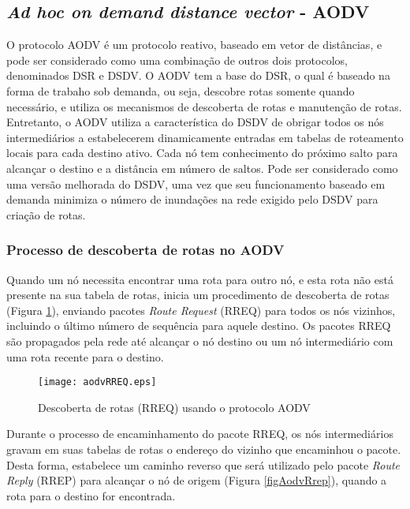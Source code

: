 \subsection{\textit{Ad hoc on demand distance vector} - AODV}
O protocolo AODV \'e um protocolo reativo\cite{gorantala}, baseado em vetor de dist\^ancias, e pode ser considerado como uma combina\c{c}\~ao de outros dois protocolos, denominados DSR e DSDV. 
O AODV tem a base do DSR, o qual \'e baseado na forma de trabaho sob demanda, ou seja, descobre rotas somente quando necess\'ario, e utiliza os mecanismos de descoberta de rotas e manuten\c{c}\~ao de rotas.
Entretanto, o AODV utiliza a caracter\'istica do DSDV de obrigar todos os n\'os intermedi\'arios a estabelecerem dinamicamente entradas em tabelas de roteamento locais para cada destino ativo.
Cada n\'o tem conhecimento do pr\'oximo salto para alcan\c{c}ar o destino e a dist\^ancia em n\'umero de saltos.
Pode ser considerado como uma vers\~ao melhorada do DSDV, uma vez que seu funcionamento baseado em demanda minimiza o n\'umero de inunda\c{c}\~oes na rede exigido pelo DSDV para cria\c{c}\~ao de rotas.

\subsubsection{Processo de descoberta de rotas no AODV}
Quando um n\'o necessita encontrar uma rota para outro n\'o, e esta rota n\~ao est\'a presente na sua tabela de rotas, inicia um procedimento de descoberta de rotas (Figura \ref{figAodvRreq}), enviando pacotes \textit{Route Request} (RREQ) para todos os n\'os vizinhos, incluindo o \'ultimo n\'umero de sequ\^encia para aquele destino. 
Os pacotes RREQ s\~ao propagados pela rede at\'e alcan\c{c}ar o n\'o destino ou um n\'o intermedi\'ario com uma rota recente para o destino.

\begin{figure}[H]
	\centering
	\texttt{[image: aodvRREQ.eps]}
	\caption{Descoberta de rotas (RREQ) usando o protocolo AODV \cite{pereira}}
	\label{figAodvRreq}
\end{figure}

Durante o processo de encaminhamento do pacote RREQ, os n\'os intermedi\'arios gravam em suas tabelas de rotas o endere\c{c}o do vizinho que encaminhou o pacote. 
Desta forma, estabelece um caminho reverso que ser\'a utilizado pelo pacote \textit{Route Reply} (RREP) para alcan\c{c}ar o n\'o de origem (Figura \ref{figAodvRrep}), quando a rota para o destino for encontrada.

